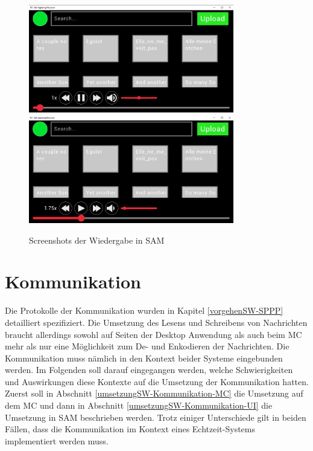 \begin{figure}[htbp]
	\centering
	\includegraphics*[width=0.8\textwidth]{img/ui-play}
	\includegraphics*[width=0.8\textwidth]{img/ui-play-2}
	\caption{Screenshots der Wiedergabe in \ac{SAM}}
	\label{img:ui-play}
\end{figure}

\section{Kommunikation} \label{umsetzungSW-Kommunikation}

Die Protokolle der Kommunikation wurden in Kapitel \ref{vorgehenSW-SPPP} detailliert spezifiziert.
Die Umsetzung des Lesens und Schreibens von Nachrichten braucht allerdings sowohl auf Seiten der Desktop Anwendung als auch beim \ac{MC} mehr als nur eine Möglichkeit zum De- und Enkodieren der Nachrichten.
Die Kommunikation muss nämlich in den Kontext beider Systeme eingebunden werden.
Im Folgenden soll darauf eingegangen werden, welche Schwierigkeiten und Auswirkungen diese Kontexte auf die Umsetzung der Kommunikation hatten.
Zuerst soll in Abschnitt \ref{umsetzungSW-Kommunikation-MC} die Umsetzung auf dem \ac{MC} und dann in Abschnitt \ref{umsetzungSW-Kommunikation-UI} die Umsetzung in \ac{SAM} beschrieben werden.
Trotz einiger Unterschiede gilt in beiden Fällen, dass die Kommunikation im Kontext eines Echtzeit-Systems implementiert werden muss.


